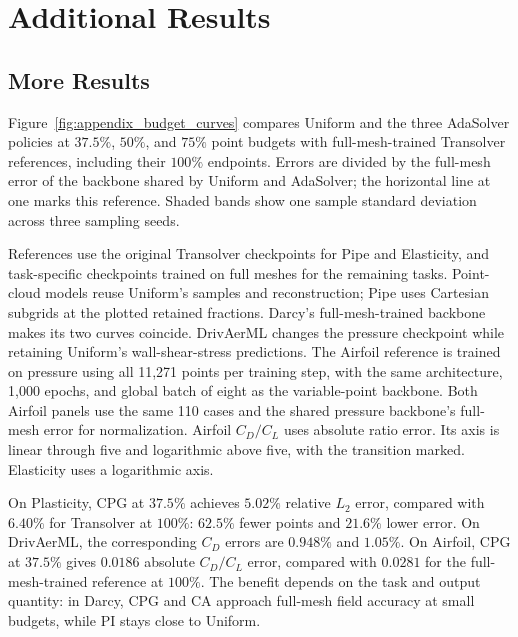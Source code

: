 \section{Additional Results}
\label{app:more_results}


\clearpage

\subsection{More Results}
\label{app:budget_curves}

Figure~\ref{fig:appendix_budget_curves} compares Uniform and the three
AdaSolver policies at $37.5\%$, $50\%$, and $75\%$ point budgets with
full-mesh-trained Transolver references, including their $100\%$ endpoints.
Errors are divided by the full-mesh error of the backbone shared by Uniform
and AdaSolver; the horizontal line at one marks this reference. Shaded bands
show one sample standard deviation across three sampling seeds.

References use the original Transolver checkpoints for Pipe and Elasticity,
and task-specific checkpoints trained on full meshes for the remaining
tasks. Point-cloud models reuse Uniform's
samples and reconstruction; Pipe uses Cartesian subgrids at the plotted
retained fractions. Darcy's full-mesh-trained backbone makes its two curves
coincide. DrivAerML changes the pressure checkpoint while retaining Uniform's
wall-shear-stress predictions. The Airfoil reference is trained on pressure
using all 11,271 points per training step, with the same architecture,
1,000 epochs, and global batch of eight as the variable-point backbone.
Both Airfoil panels use the same 110 cases and the shared pressure backbone's
full-mesh error for normalization. Airfoil $C_D/C_L$ uses absolute ratio error.
Its axis is linear through five and logarithmic above five, with the
transition marked. Elasticity uses a logarithmic axis.

On Plasticity, CPG at
$37.5\%$ achieves $5.02\%$ relative $L_2$ error, compared with $6.40\%$ for
Transolver at $100\%$: $62.5\%$ fewer points and $21.6\%$ lower error.
On DrivAerML, the corresponding $C_D$ errors are $0.948\%$ and $1.05\%$.
On Airfoil, CPG at $37.5\%$ gives $0.0186$ absolute $C_D/C_L$ error,
compared with $0.0281$ for the full-mesh-trained reference at $100\%$.
The benefit depends on the task and output quantity: in Darcy, CPG and CA
approach full-mesh field accuracy at small budgets, while PI stays close to
Uniform.

